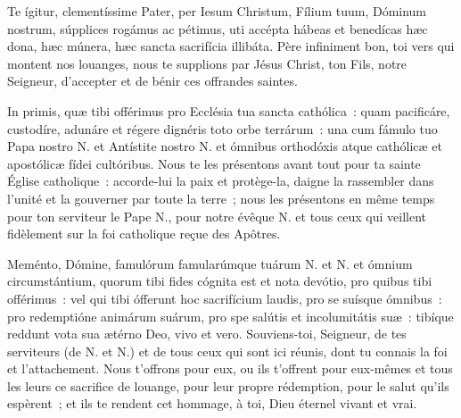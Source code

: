 \begin{paracol}{2}

\LigneParacol{0cm}
{Te ígitur, clementíssime Pater, per Iesum Christum, Fílium tuum, Dóminum nostrum, súpplices rogámus ac pétimus, uti accépta hábeas et benedícas hæc dona, hæc múnera, hæc sancta sacrifícia illibáta.}
{Père infiniment bon, toi vers qui mon\-tent nos louanges, nous te supplions par Jésus Christ, ton Fils, notre Seigneur, d'accepter et de bénir ces offrandes saintes.}

\LigneParacol{0cm}
{In primis, quæ tibi offérimus pro Ecclésia tua sancta cathólica~: quam pacificáre, custodíre, adunáre et régere dignéris toto orbe terrárum~: una cum fámulo tuo Papa nostro {\color{rougeliturgique}N.} et Antístite nostro {\color{rougeliturgique}N.} et ómnibus orthodóxis atque cathólicæ et apostólicæ fídei cultóribus.}
{Nous te les présentons avant tout pour ta sainte Église catholique~: accorde-lui la paix et protège-la, daigne la rassembler dans l'unité et la gouverner par toute la terre~; nous les présentons en même temps pour ton serviteur le Pape {\color{rougeliturgique}N.}, pour notre évêque {\color{rougeliturgique}N.} et tous ceux qui veillent fidèlement sur la foi catholique reçue des Apôtres.}

\LigneParacol{0cm}
{Meménto, Dómine, famulórum famularúmque tuárum {\color{rougeliturgique}N.} et {\color{rougeliturgique}N.} et ómnium circumstántium, quorum tibi fides cógnita est et nota devótio, pro quibus tibi offérimus~: vel qui tibi ófferunt hoc sacrifícium laudis, pro se suísque ómnibus~: pro redemptióne animárum suárum, pro spe salútis et incolumitátis suæ~: tibíque reddunt vota sua ætérno Deo, vivo et vero.}
{Souviens-toi, Seigneur, de tes serviteurs (de {\color{rougeliturgique}N.} et {\color{rougeliturgique}N.}) et de tous ceux qui sont ici réunis, dont tu connais la foi et l'attachement. Nous t'offrons pour eux, ou ils t'offrent pour eux-mêmes et tous les leurs ce sacrifice de louange, pour leur propre rédemption, pour le salut qu'ils espèrent~; et ils te rendent cet hommage, à toi, Dieu éternel vivant et vrai.}


\end{paracol}
